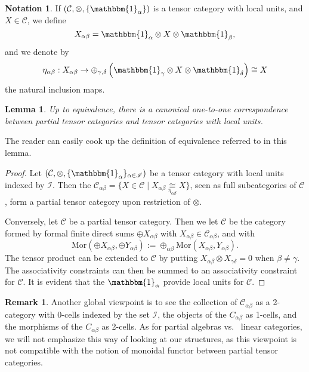 \documentclass[10pt]{article}
\newcommand{\CatC}{\mathcal{C}}
\newcommand{\CatCC}{\mathscr{C}}
\newcommand{\Mor}{\mathrm{Mor}}
\newcommand{\Unitb}{\mathbbm{1}}
\newtheorem{Lem}[Theorem]{Lemma}
\theoremstyle{definition}
\newtheorem{Rem}[Theorem]{Remark}
\newtheorem{Not}[Theorem]{Notation}
\numberwithin{equation}{section}
\begin{document}
\begin{Not} If $(\CatC,\otimes,\{\Unitb_\alpha\})$ is a tensor category with local units, and $X\in \CatC$, we define \[X_{\alpha\beta} = \Unitb_\alpha\otimes X \otimes \Unitb_\beta,\] and we denote by \[\eta_{\alpha\beta}:X_{\alpha\beta} \rightarrow \oplus_{\gamma,\delta} \left(\Unitb_\gamma \otimes X \otimes \Unitb_\delta\right) \cong X\] the natural inclusion maps. 
\end{Not}

\begin{Lem} Up to equivalence, there is a canonical one-to-one correspondence between partial tensor categories and tensor categories with local units. 
\end{Lem}

The reader can easily cook up the definition of equivalence referred to in this lemma.

\begin{proof} Let $(\CatC,\otimes,\{\Unitb_\alpha\}_{\alpha\in \mathscr{I}})$ be a tensor category with local units indexed by $\mathscr{I}$. Then the $\CatC_{\alpha\beta} = \{X \in \CatC\mid X_{\alpha\beta} \underset{\eta_{\alpha\beta}}{\cong} X\}$, seen as full subcategories of $\CatC$, form a partial tensor category upon restriction of $\otimes$.

Conversely, let $\CatCC$ be a partial tensor category. Then we let $\CatC$ be the category formed by formal finite direct sums $\oplus X_{\alpha\beta}$ with $X_{\alpha\beta}\in \CatC_{\alpha\beta}$, and with \[\Mor(\oplus X_{\alpha\beta},\oplus Y_{\alpha\beta}) := \oplus_{\alpha\beta} \Mor(X_{\alpha\beta},Y_{\alpha\beta}).\] The tensor product can be extended to $\CatC$ by putting $X_{\alpha\beta} \otimes X_{\gamma\delta} = 0$ when $\beta\neq \gamma$. The associativity constraints can then be summed to an associativity constraint for $\CatC$. It is evident that the $\Unitb_\alpha$ provide local units for $\CatC$. 
\end{proof}

\begin{Rem} Another global viewpoint is to see the collection of $\CatC_{\alpha\beta}$ as a 2-category with 0-cells indexed by the set $\mathscr{I}$, the objects of the $C_{\alpha\beta}$ as 1-cells, and  the morphisms of the $C_{\alpha\beta}$ as 2-cells. As for partial algebras vs.~ linear categories, we will not emphasize this way of looking at our structures, as this viewpoint is not compatible with the notion of monoidal functor between partial tensor categories.
\end{Rem} 
\end{document}
